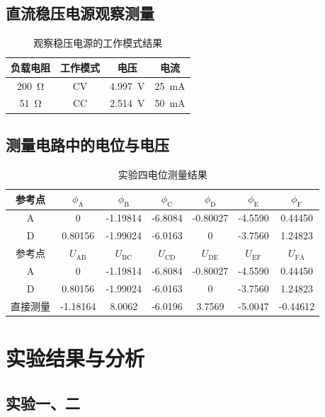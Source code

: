 \documentclass[a4paper,utf8]{article}
\begin{document}
    \subsection{直流稳压电源观察测量}
        \begin{table}[!ht]\caption{观察稳压电源的工作模式结果}\centering
            \begin{tabular}{c c c c}\toprule
                负载电阻 & 工作模式 & 电压 & 电流 \\ \midrule
                \SI{200}{\ohm} & CV & \SI{4.997}{\V} & \SI{25}{\mA} \\
                \SI{51}{\ohm} & CC & \SI{2.514}{\V} & \SI{50}{\mA} \\ \bottomrule
            \end{tabular}
        \end{table}
    \subsection{测量电路中的电位与电压}
    \begin{table}[!ht]
        \caption{实验四电位测量结果}
        \begin{tabularx}{\textwidth}{C*{6}{S[table-format=3.6]}} \toprule
            参考点 & {$\phi_\text{A}$} & {$\phi_\text{B}$} & {$\phi_\text{C}$} & {$\phi_\text{D}$} & {$\phi_\text{E}$} & {$\phi_\text{F}$} \\ \midrule
            A & 0 & -1.19814 & -6.8084 & -0.80027 & -4.5590 & 0.44450 \\ 
            D & 0.80156 & -1.99024 & -6.0163 & 0 & -3.7560 & 1.24823 \\ \bottomrule \toprule
            参考点 & {$U_\text{AB}$} & {$U_\text{BC}$} & {$U_\text{CD}$} & {$U_\text{DE}$} & {$U_\text{EF}$} & {$U_\text{FA}$} \\ \midrule
            A & 0 & -1.19814 & -6.8084 & -0.80027 & -4.5590 & 0.44450 \\ 
            D & 0.80156 & -1.99024 & -6.0163 & 0 & -3.7560 & 1.24823 \\ 
            直接测量 & -1.18164 & 8.0062 & -6.0196 & 3.7569 & -5.0047 & -0.44612 \\ \bottomrule
        \end{tabularx}
    \end{table}
\section{实验结果与分析}
\subsection{实验一、二}
\end{document}
